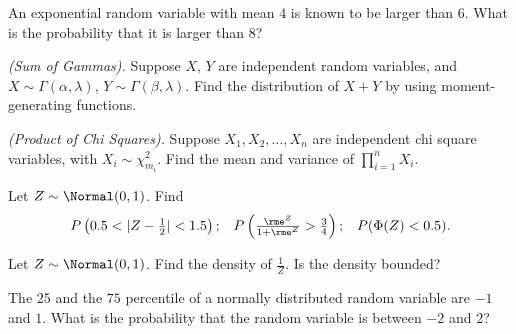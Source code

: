 \begin{problem}[Handout 13, \# 17]
  An exponential random variable with mean \(4\) is known to be larger than
  \(6\). What is the probability that it is larger than \(8\)?
\end{problem}
\begin{solution}

\end{solution}
\newpage

\begin{problem}[Handout 13, \# 18]
  \emph{(Sum of Gammas).} Suppose \(X\), \(Y\) are independent random
  variables, and \(X\sim \Gamma(\alpha,\lambda)\),
  \(Y\sim \Gamma(\beta,\lambda)\). Find the distribution of \(X+Y\) by
  using moment-generating functions.
\end{problem}
\begin{solution}
\end{solution}
\newpage

\begin{problem}[Handout 13, \# 19]
  \emph{(Product of Chi Squares).} Suppose \(X_1,X_2,\dotsc,X_n\) are
  independent chi square variables, with \(X_i\sim\chi_{m_i}^2\). Find the
  mean and variance of \(\prod_{i=1}^n X_i\).
\end{problem}
\begin{solution}

\end{solution}
\newpage

\begin{problem}[Handout 13, \# 20]
  Let \(Z\sim\Normal(0,1)\). Find
  \[
    \begin{aligned}
      P\left( 0.5<|Z-\tfrac{1}{2}|<1.5\right);
      && P\left(\tfrac{\rme^Z}{1+\rme^Z}>\tfrac{3}{4}\right);
      &&P(\Phi(Z)<0.5).
    \end{aligned}
  \]
\end{problem}
\begin{solution}

\end{solution}
\newpage

\begin{problem}[Handout 13, \# 21]
  Let \(Z\sim\Normal(0,1)\). Find the density of \(\frac{1}{Z}\). Is the
  density bounded?
\end{problem}
\begin{solution}

\end{solution}
\newpage

\begin{problem}[Handout 13, \# 22]
  The \(25\) and the \(75\) percentile of a
  normally distributed random variable are \(-1\) and \(1\). What is the
  probability that the random variable is between \(-2\) and \(2\)?
\end{problem}
\begin{solution}

\end{solution}

